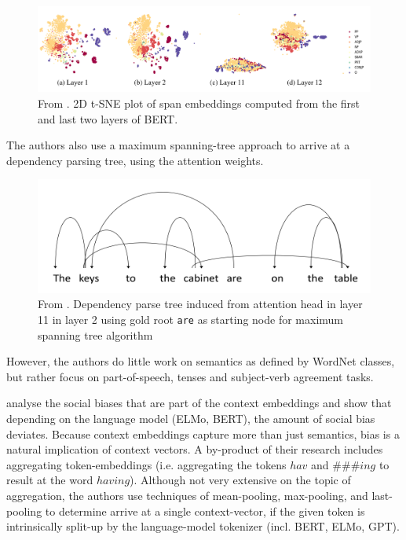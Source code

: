 \documentclass[a4paper,12pt,twoside,openright]{report}
\begin{document}
\begin{figure}[H]
	\center
  \includegraphics[width=0.9\linewidth]{./assets/relatedwork/BERT_tsne_layers.png}
  \caption{From \cite{jawahar19}. 2D t-SNE plot of span embeddings computed from the first and last two layers of BERT.}
  \label{fig:cold_fictional_desired}
\end{figure}

The authors also use a maximum spanning-tree approach to arrive at a dependency parsing tree, using the attention weights.

\begin{figure}[H]
	\center
  \includegraphics[width=0.7\linewidth]{./assets/relatedwork/BERT_dependency_parsing.png}
  \caption{From \cite{jawahar19}. Dependency parse tree induced from attention head in layer 11 in layer 2 using gold root \texttt{are} as starting node for maximum spanning tree algorithm}
  \label{fig:cold_fictional_desired}
\end{figure}

However, the authors do little work on semantics as defined by WordNet classes, but rather focus on part-of-speech, tenses and subject-verb agreement tasks.

\cite{may19} analyse the social biases that are part of the context embeddings and show that depending on the language model (ELMo, BERT), the amount of social bias deviates. 
Because context embeddings capture more than just semantics, bias is a natural implication of context vectors.
A by-product of their research includes aggregating token-embeddings (i.e. aggregating the tokens $hav$ and $\#\#\#ing$ to result at the word $having$).
Although not very extensive on the topic of aggregation, the authors  use techniques of mean-pooling, max-pooling, and last-pooling to determine arrive at a single context-vector, if the given token is intrinsically split-up by the language-model tokenizer (incl. BERT, ELMo, GPT).
\end{document}
